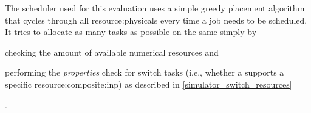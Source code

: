 The scheduler used for this evaluation uses a simple greedy placement algorithm that cycles through all \glspl{resource:physical} every time a job needs to be scheduled.
It tries to allocate as many tasks as possible on the same  simply by
\begin{mylist}
    \item checking the amount of available numerical resources and
    \item performing the \textit{properties} check for switch tasks
    \ifdefined\THESISSUMMARY
    (i.e., whether a  supports a specific \gls{resource:composite:inp})
    \else
    as described in \autoref{simulator_switch_resources}
    \fi
\end{mylist}.